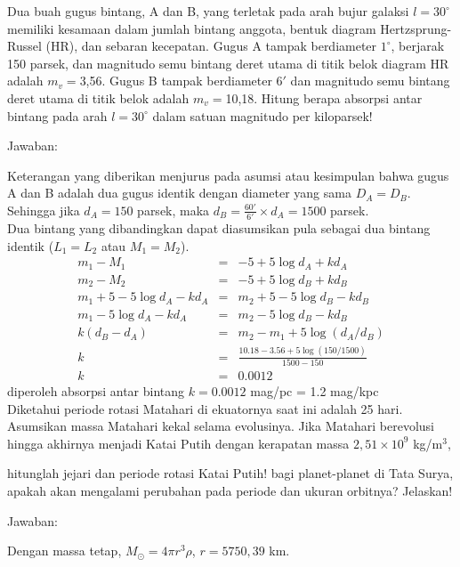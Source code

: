 \documentclass[11pt,fleqn]{exam}
\begin{document}
\begin{questions}
\question Dua buah gugus bintang, A dan B, yang terletak pada arah bujur galaksi $l = 30^{\circ}$ memiliki kesamaan dalam jumlah bintang anggota, bentuk diagram Hertzsprung-Russel (HR), dan sebaran kecepatan. Gugus A tampak berdiameter $1^{\circ}$, berjarak 150 parsek, dan magnitudo semu bintang deret utama di titik belok diagram HR adalah $m_v = $3,56. Gugus B tampak berdiameter $6'$ dan magnitudo semu bintang deret utama di titik belok adalah $m_v = $10,18. Hitung berapa absorpsi antar bintang pada arah $l = 30^{\circ}$ dalam satuan magnitudo per kiloparsek!

Jawaban:

Keterangan yang diberikan menjurus pada asumsi atau kesimpulan bahwa gugus A dan B adalah dua gugus identik dengan diameter yang sama $D_{A} = D_{B}$. Sehingga jika $d_{A} = 150$ parsek, maka $d_{B} = \frac{60'}{6'} \times d_{A} = 1500$ parsek.\\ 
Dua bintang yang dibandingkan dapat diasumsikan pula sebagai dua bintang identik ($L_1 = L_2$ atau $M_1 = M_2$).
\begin{eqnarray*}
m_1 - M_1 &=& -5 + 5 \log d_A + kd_A\\
m_2 - M_2 &=& -5 + 5 \log d_B + kd_B\\
m_1 + 5 - 5 \log d_A - kd_A &=& m_2 + 5 - 5 \log d_B - kd_B\\
m_1 - 5 \log d_A - kd_A &=& m_2 - 5 \log d_B - kd_B\\
k(d_B - d_A) &=& m_2 - m_1 + 5 \log (d_A/d_B)\\
k &=& \frac{10.18 - 3.56 + 5 \log (150/1500)}{1500-150}\\
k &=& 0.0012
\end{eqnarray*}
diperoleh absorpsi antar bintang $k = 0.0012$ mag/pc = 1.2 mag/kpc \\


\question Diketahui periode rotasi Matahari di ekuatornya saat ini adalah 25 hari. Asumsikan massa Matahari kekal selama evolusinya. Jika Matahari berevolusi hingga akhirnya menjadi Katai Putih dengan kerapatan massa $2,51\times 10^9$ kg/m$^3$,
\begin{choices}
\choice hitunglah jejari dan periode rotasi Katai Putih!
\choice bagi planet-planet di Tata Surya, apakah akan mengalami perubahan pada periode dan ukuran orbitnya? Jelaskan!
\end{choices}

Jawaban:

\begin{choices}
\choice Dengan massa tetap, $M_{\odot}=4\pi r^3 \rho$, $r=5750,39$ km.


\end{choices}
\end{questions}
\end{document}
